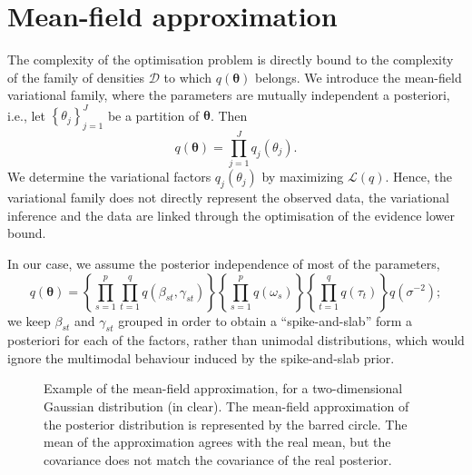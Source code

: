 \documentclass[a4paper, 11pt]{report}
\numberwithin{equation}{chapter}
\begin{document}
\section{Mean-field approximation}
The complexity of the optimisation problem is directly bound to the complexity of the family of densities $\mathcal{D}$ to which $q(\boldsymbol{\theta})$ belongs. We introduce the mean-field variational family, where the parameters are mutually independent a posteriori, i.e., let $\left\lbrace \theta_j\right\rbrace_{j=1}^J$ be a partition of $\boldsymbol{\theta}$. Then
\begin{equation*}
q(\boldsymbol{\theta}) = \prod_{j=1}^J q_j(\theta_j).
\end{equation*}
We determine the variational factors $q_j(\theta_j)$ by maximizing $\mathcal{L}(q)$. Hence, the variational family does not directly represent the observed data, the variational inference and the data are linked through the optimisation of the evidence lower bound.

In our case, we assume the posterior independence of most of the parameters,
\begin{equation*}
q(\boldsymbol{\theta}) =\left\lbrace\prod_{s=1}^p \prod_{t=1}^q q(\beta_{st}, \gamma_{st})\right\rbrace \left\lbrace\prod_{s=1}^p  q(\omega_s)\right\rbrace \left\lbrace\prod_{t=1}^q q(\tau_t)\right\rbrace q(\sigma^{-2});
\end{equation*}
we keep $\beta_{st}$ and $\gamma_{st}$ grouped in order to obtain a ``spike-and-slab'' form a posteriori for each of the factors, rather than unimodal distributions, which would ignore the multimodal behaviour induced by the spike-and-slab prior.

\begin{figure}[t]
\centering
{}
\caption{\label{fig:mean_field}Example of the mean-field approximation, for a two-dimensional Gaussian distribution (in clear). The mean-field approximation of the posterior distribution is represented by the barred circle. The mean of the approximation agrees with the real mean, but the covariance does not match the covariance of the real posterior.}
\end{figure}
\end{document}
